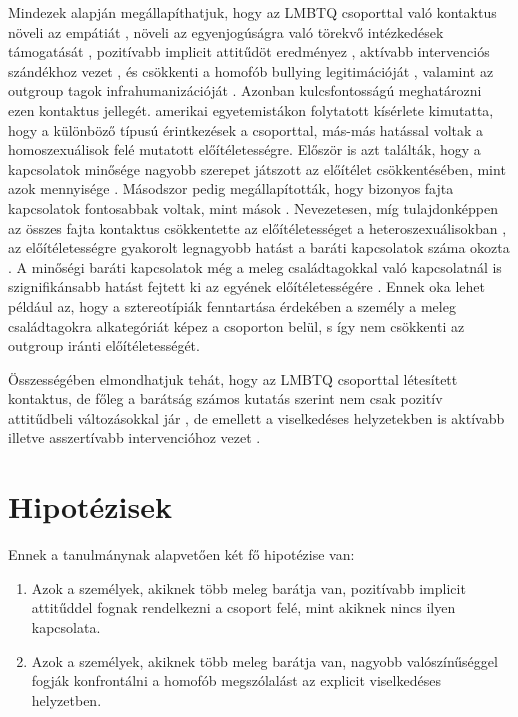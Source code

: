Mindezek alapján megállapíthatjuk, hogy az LMBTQ csoporttal való kontaktus növeli az empátiát \parencite{abbott_cameron_2014}, növeli az egyenjogúságra való törekvő intézkedé\-sek támogatását \parencite{dasgupta_rivera_2008}, pozitívabb implicit attitűdöt eredményez \parencite{dasgupta_rivera_2008} , aktívabb intervenciós szándékhoz vezet \parencite{poteat_vecho_2016}, és csökkenti a homofób bullying legitimációját \parencite{zotti_carnaghi_piccoli_bianchi_2018}, valamint az outgroup  tagok infrahumanizációját \parencite{capozza_falvo_trifiletti_pagani_2014}. Azonban kulcsfontosságú meghatározni ezen kontaktus jellegét. \textcite{baunach_burgess_muse_2009} amerikai egyetemistákon folytatott kísérlete kimutatta, hogy a különböző típusú érintkezések a csoporttal, más-más hatással voltak a homoszexuálisok felé mutatott előítéletességre. Először is azt találták, hogy a kapcsolatok minősége nagyobb szerepet játszott az előítélet csökkentésében, mint azok mennyisége \parencite{baunach_burgess_muse_2009}. Másodszor pedig megállapították, hogy bizonyos fajta kapcsolatok fontosabbak voltak, mint mások \parencite{baunach_burgess_muse_2009}. Nevezetesen, míg tulajdonképpen az összes fajta kontaktus csökkentette az előítéletességet a heteroszexuálisokban \parencite{baunach_burgess_muse_2009}, az előítéletesség\-re gyakorolt legnagyobb hatást a baráti kapcsolatok száma okozta \parencite{baunach_burgess_muse_2009}. A minőségi baráti kapcsolatok még a meleg családtagokkal való kapcsolatnál is szignifikánsabb hatást fejtett ki az egyének előítéletességére \parencite{baunach_burgess_muse_2009}. Ennek oka lehet például az, hogy a sztereotípiák fenntartása érdekében a személy a meleg családtagokra alkategóriát képez a csoporton belül, s így nem csökkenti az outgroup iránti előítéletességét.
\\
\par
Összességében elmondhatjuk tehát, hogy az LMBTQ csoporttal létesített kontaktus, de főleg a barátság \parencite{baunach_burgess_muse_2009} számos kutatás szerint nem csak pozitív attitűdbeli változásokkal jár \parencite{dasgupta_rivera_2008}, de emellett a viselkedéses helyzetekben is aktívabb illetve asszertívabb intervencióhoz vezet \parencite{zotti_carnaghi_piccoli_bianchi_2018,}. 

\pagebreak
\section{Hipotézisek}
Ennek a tanulmánynak alapvetően két fő hipotézise van:
\begin{enumerate}
	\item Azok a személyek, akiknek több meleg barátja van, pozitívabb implicit attitűddel fognak rendelkezni a csoport felé, mint akiknek nincs ilyen kapcsolata.
	\item Azok a személyek, akiknek több meleg barátja van, nagyobb valószínűséggel fogják konfrontálni a homofób megszólalást az explicit viselkedéses helyzetben.
\end{enumerate}


